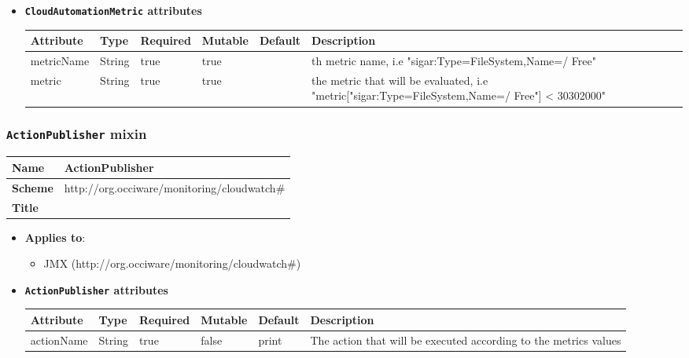 \begin{itemize}
\item \textbf{\texttt{CloudAutomationMetric} attributes}

\begin{tabularx}{\textwidth}{|l|l|p{1.4cm}|p{1.3cm}|l|X|}
  \hline
  \textbf{Attribute} & \textbf{Type} & \textbf{Required} & \textbf{Mutable} & \textbf{Default} & \textbf{Description} \\
  \hline  
  metricName & String & true & true &  & th metric name, i.e "sigar:Type=FileSystem,Name=/ Free" \\
  \hline
  metric & String & true & true &  & the metric that will be evaluated, i.e "metric["sigar:Type=FileSystem,Name=/ Free"]  < 30302000" \\
  \hline
\end{tabularx}
\end{itemize}


 
\subsubsection{\texttt{ActionPublisher} mixin}
\begin{center}
\begin{tabular}{|l|l|}
  \hline
  \textbf{Name} & ActionPublisher \\
  \hline  
  \textbf{Scheme} & http://org.occiware/monitoring/cloudwatch\# \\
  \hline
  \textbf{Title} &  \\
  \hline
\end{tabular}
\end{center}
\begin{itemize}
\item \textbf{Applies to}:
\begin{itemize}
	\item JMX (http://org.occiware/monitoring/cloudwatch\#)
\end{itemize}
\end{itemize} 

\begin{itemize}
\item \textbf{\texttt{ActionPublisher} attributes}

\begin{tabularx}{\textwidth}{|l|l|p{1.4cm}|p{1.3cm}|l|X|}
  \hline
  \textbf{Attribute} & \textbf{Type} & \textbf{Required} & \textbf{Mutable} & \textbf{Default} & \textbf{Description} \\
  \hline  
  actionName & String & true & false & print & The action that will be executed according to the metrics values \\
  \hline
\end{tabularx}
\end{itemize}


 
